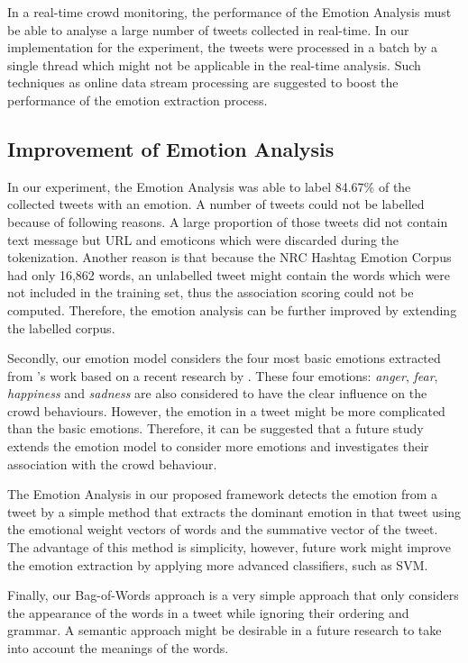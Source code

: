 In a real-time crowd monitoring, the performance of the Emotion Analysis must be able to analyse a large number of tweets collected in real-time. In our implementation for the experiment, the tweets were processed in a batch by a single thread which might not be applicable in the real-time analysis. Such techniques as online data stream processing are suggested to boost the performance of the emotion extraction process.

\subsection{Improvement of Emotion Analysis}
In our experiment, the Emotion Analysis was able to label 84.67\% of the collected tweets with an emotion. A number of tweets could not be labelled because of following reasons. A large proportion of those tweets did not contain text message but URL and emoticons which were discarded during the tokenization. Another reason is that because the NRC Hashtag Emotion Corpus had only 16,862 words, an unlabelled tweet might contain the words which were not included in the training set, thus the association scoring could not be computed. Therefore, the emotion analysis can be further improved by extending the labelled corpus.

Secondly, our emotion model considers the four most basic emotions extracted from \citet{ekman1971constants}'s work based on a recent research by \citet{Jack2014}. These four emotions: \textit{anger}, \textit{fear}, \textit{happiness} and \textit{sadness} are also considered to have the clear influence on the crowd behaviours. However, the emotion in a tweet might be more complicated than the basic emotions. Therefore, it can be suggested that a future study extends the emotion model to consider more emotions and investigates their association with the crowd behaviour.

The Emotion Analysis in our proposed framework detects the emotion from a tweet by a simple method that extracts the dominant emotion in that tweet using the emotional weight vectors of words and the summative vector of the tweet. The advantage of this method is simplicity, however, future work might improve the emotion extraction by applying more advanced classifiers, such as SVM.

Finally, our Bag-of-Words approach is a very simple approach that only considers the appearance of the words in a tweet while ignoring their ordering and grammar. A semantic approach might be desirable in a future research to take into account the meanings of the words.

